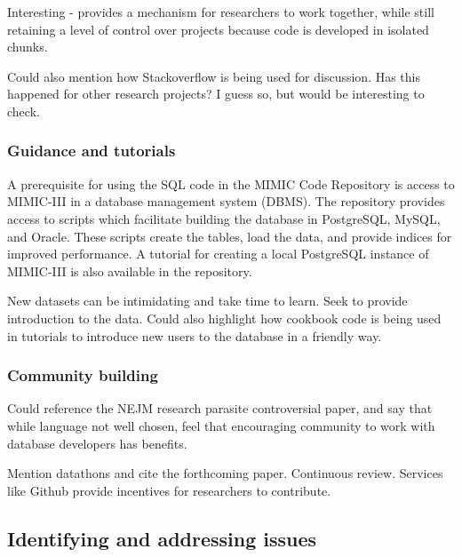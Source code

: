 \documentclass{bioinfo}
\begin{document}
\begin{methods}
Interesting - provides a mechanism for researchers to work together, while still retaining a level of control over projects because code is developed in isolated chunks.

Could also mention how Stackoverflow is being used for discussion. Has this happened for other research projects? I guess so, but would be interesting to check.

\subsubsection{Guidance and tutorials}

A prerequisite for using the SQL code in the MIMIC Code Repository is access to MIMIC-III in a database management system (DBMS). The repository provides access to scripts which facilitate building the database in PostgreSQL, MySQL, and Oracle. These scripts create the tables, load the data, and provide indices for improved performance. A tutorial for creating a local PostgreSQL instance of MIMIC-III is also available in the repository.

New datasets can be intimidating and take time to learn. Seek to provide introduction to the data. Could also highlight how cookbook code is being used in tutorials to introduce new users to the database in a friendly way.

\subsubsection{Community building}

Could reference the NEJM research parasite controversial paper, and say that while language not well chosen, feel that encouraging community to work with database developers has benefits.

Mention datathons and cite the forthcoming paper.  Continuous review. Services like Github provide incentives for researchers to contribute.

\subsection{Identifying and addressing issues}





\end{methods}
\end{document}
